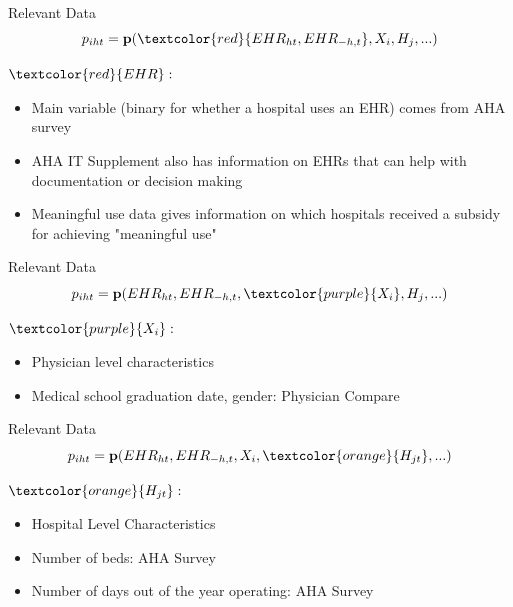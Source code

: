 \documentclass[10pt]{beamer}
\begin{document}
\begin{frame}[noframenumbering]{Relevant Data}
\begin{equation*}
    p_{iht}=\textbf{p}(\textcolor{red}{EHR_{ht},EHR_{-h,t}},X_i,H_j,...)
\end{equation*}

$\textcolor{red}{EHR}:$
\begin{itemize}
    \item Main variable (binary for whether a hospital uses an EHR) comes from AHA survey
    \item AHA IT Supplement also has information on EHRs that can help with documentation or decision making
    \item Meaningful use data gives information on which hospitals received a subsidy for achieving "meaningful use"
\end{itemize}
\end{frame}

\begin{frame}[noframenumbering]{Relevant Data}
\begin{equation*}
    p_{iht}=\textbf{p}(EHR_{ht},EHR_{-h,t},\textcolor{purple}{X_i},H_j,...)
\end{equation*}

$\textcolor{purple}{X_i}:$
\begin{itemize}
    \item Physician level characteristics
    \item Medical school graduation date, gender: Physician Compare
\end{itemize}
\end{frame}

\begin{frame}[noframenumbering]{Relevant Data}
\begin{equation*}
    p_{iht}=\textbf{p}(EHR_{ht},EHR_{-h,t},X_i,\textcolor{orange}{H_{jt}},...)
\end{equation*}

$\textcolor{orange}{H_{jt}}:$
\begin{itemize}
    \item Hospital Level Characteristics
    \item Number of beds: AHA Survey
    \item Number of days out of the year operating: AHA Survey
\end{itemize}
\end{frame}
\end{document}
